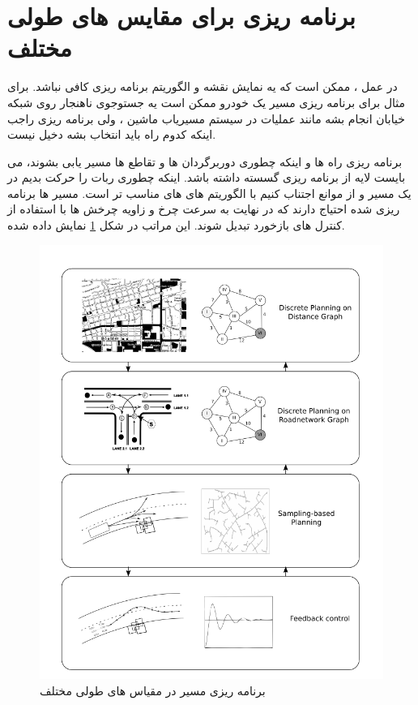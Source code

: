 \section{برنامه ریزی برای مقایس های طولی مختلف}
در عمل ، ممکن است که یه نمایش نقشه و الگوریتم برنامه ریزی کافی نباشد. برای مثال برای برنامه
 ریزی مسیر یک خودرو ممکن است یه جستوجوی ناهنجار روی شبکه خیابان انجام بشه مانند عملیات در
 سیستم مسیریاب ماشین ، ولی برنامه ریزی راجب اینکه کدوم راه باید انتخاب بشه دخیل نیست.

برنامه ریزی راه ها و اینکه چطوری دوربرگردان ها و تقاطع ها مسیر یابی بشوند، می بایست لایه از برنامه
 ریزی گسسته داشته باشد. اینکه چطوری ربات را حرکت بدیم در یک مسیر و از موانع اجتناب کنیم  با 
الگوریتم های های
مناسب تر است. مسیر ها برنامه ریزی شده احتیاج دارند که در
 نهایت به سرعت چرخ و زاویه چرخش ها با استفاده از کنترل های بازخورد تبدیل شوند. این مراتب در
 شکل
\ref{fig:scale}
  نمایش داده شده. 
 \begin{figure}[H]
  \includegraphics[width = \textwidth]{images/scale.png}
  \caption{برنامه ریزی مسیر در مقیاس های طولی مختلف}
  \label{fig:scale}
\end{figure}
